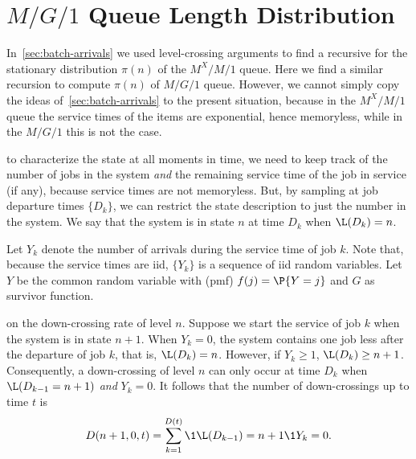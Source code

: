

\section{$M/G/1$ Queue Length Distribution}\label{sec:distr-queue-length}



In~\cref{sec:batch-arrivals} we used level-crossing arguments to find a recursive for the stationary distribution $\pi(n)$ of the $M^X/M/1$ queue.
Here we find a similar recursion to compute $\pi(n)$ of $M/G/1$ queue.
However, we cannot simply copy the ideas of~\cref{sec:batch-arrivals} to the present situation, because in the $M^X/M/1$ queue the service times of the items are exponential, hence memoryless, while in the $M/G/1$ this is not the case.




 to characterize the state at all moments in time, we need to keep track of the number of jobs in the system \emph{and} the remaining service time of the job in service (if any), because service times are not memoryless.
But, by sampling at job departure times $\{D_k\}$, we can restrict the state description to just the number in the system.
We say that the system is in state $n$ at time $D_k$ when $\L(D_k)=n$.

Let $Y_k$ denote the number of arrivals during the service time of job $k$.
Note that, because the service times are iid, $\{Y_k\}$ is a sequence of iid random variables.
Let $Y$ be the common random variable with (pmf) $f(j) = \P{Y = j}$ and $G$ as survivor function.



 on the down-crossing rate of level $n$.
Suppose we start the service of job $k$ when the system is in state $n+1$.
When $Y_k=0$, the system contains one job less
after the departure of job $k$, that is, $\L(D_k) = n$.
However, if $Y_k\geq 1$,  $\L(D_k) \geq  n +1$.
Consequently, a down-crossing of level $n$ can only occur at time $D_k$ when $\L(D_{k-1}=n+1)$ \emph{and} $Y_k = 0$.
It follows that the number of down-crossings up to time $t$ is
\begin{equation*}
 D(n+1, 0, t)  = \sum_{k=1}^{D(t)}\1{\L(D_{k-1})=n+1}\1{Y_k=0}.
\end{equation*}



